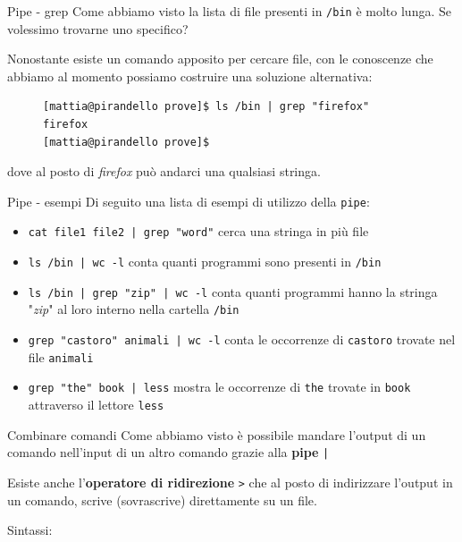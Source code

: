 \begin{frame}[fragile]{Pipe - grep}
  Come abbiamo visto la lista di file presenti in \texttt{/bin} è molto lunga.
  Se volessimo trovarne uno specifico? \bigskip

  Nonostante esiste un comando apposito per cercare file, con le conoscenze che 
  abbiamo al momento possiamo costruire una soluzione alternativa:\bigskip

  \begin{figure}
    \begin{lstlisting}
[mattia@pirandello prove]$ ls /bin | grep "firefox" 
firefox
[mattia@pirandello prove]$
    \end{lstlisting}
  \end{figure}
  
  dove al posto di \textit{firefox} può andarci una qualsiasi stringa. \bigskip
\end{frame}

\begin{frame}{Pipe - esempi}
  Di seguito una lista di esempi di utilizzo della \texttt{pipe}:
  \begin{itemize}
    \item \texttt{cat file1 file2 | grep "word"} cerca una stringa in più file
    \item \texttt{ls /bin | wc -l} conta quanti programmi sono presenti in 
      \texttt{/bin}
    \item \texttt{ls /bin | grep "zip" | wc -l} conta quanti programmi hanno
      la stringa "\textit{zip}" al loro interno nella cartella \texttt{/bin}
    \item \texttt{grep "castoro" animali | wc -l} conta le occorrenze di 
      \texttt{castoro} trovate nel file \texttt{animali}
    \item \texttt{grep "the" book | less} mostra le occorrenze di \texttt{the} 
      trovate in \texttt{book} attraverso il lettore \texttt{less}
  \end{itemize}
\end{frame}

\begin{frame}[fragile]{Combinare comandi}
  Come abbiamo visto è possibile mandare l'output di un comando nell'input di
  un altro comando grazie alla \textbf{pipe} \texttt{|}\bigskip

  Esiste anche l'\textbf{operatore di ridirezione} \texttt{>} che al posto di
  indirizzare l'output in un comando, scrive (sovrascrive) direttamente su un file.\bigskip

  Sintassi: \bigskip
\end{frame}


